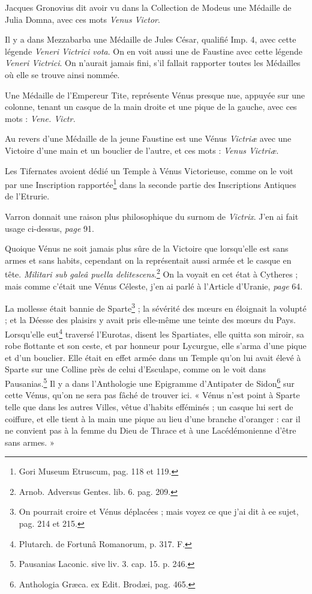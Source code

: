 \documentclass[a4paper, 18pt, oneside]{article}
\begin{document}
Jacques Gronovius dit avoir vu dans la Collection de Modeus une Médaille de Julia Domna, avec ces mots \emph{Venus Victor}.

Il y a dans Mezzabarba une Médaille de Jules César, qualifié Imp. 4, avec cette légende \emph{Veneri Victrici vota}. On en voit aussi une de Faustine avec cette légende \emph{Veneri Victrici}. On n'aurait jamais fini, s'il fallait rapporter toutes les Médailles où elle se trouve ainsi nommée.

Une Médaille de l'Empereur Tite, représente Vénus presque nue, appuyée sur une colonne, tenant un casque de la main droite et une pique de la gauche, avec ces mots : \emph{Vene. Victr.}

Au revers d'une Médaille de la jeune Faustine est une Vénus \emph{Victriæ} avec une Victoire d'une main et un bouclier de l'autre, et ces mots : \emph{Venus Victriæ}.

Les Tifernates avoient dédié un Temple à Vénus Victorieuse, comme on le voit par une Inscription rapportée\footnote{Gori Museum Etruscum, pag. 118 et 119.} dans la seconde partie des Inscriptions Antiques de l'Etrurie.

Varron donnait une raison plus philosophique du surnom de \emph{Victrix}. J'en ai fait usage ci-dessus, \emph{page} 91.

Quoique Vénus ne soit jamais plus sûre de la Victoire que lorsqu'elle est sans armes et sans habits, cependant on la représentait aussi armée et le casque en tête. \emph{Militari sub galeâ puella delitescens}.\footnote{Arnob. Adversus Gentes. lib. 6. pag. 209.} On la voyait en cet état à Cytheres ; mais comme c'était une Vénus Céleste, j'en ai parlé à l'Article d'Uranie, \emph{page} 64.

La mollesse était bannie de Sparte\footnote{On pourrait croire et Vénus déplacées ; mais voyez ce que j'ai dit à ee sujet, pag. 214 et 215.} ; la sévérité des mœurs en éloignait la volupté ; et la Déesse des plaisirs y avait pris elle-même une teinte des mœurs du Pays. Lorsqu'elle eut\footnote{Plutarch. de Fortunâ Romanorum, p. 317. F.} traversé l'Eurotas, disent les Spartiates, elle quitta son miroir, sa robe flottante et son ceste, et par honneur pour Lycurgue, elle s'arma d'une pique et d'un bouclier. Elle était en effet armée dans un Temple qu'on lui avait élevé à Sparte sur une Colline près de celui d'Esculape, comme on le voit dans Pausanias.\footnote{Pausanias Laconic. sive liv. 3. cap. 15. p. 246.} Il y a dans l'Anthologie une Epigramme d'Antipater de Sidon\footnote{Anthologia Græca. ex Edit. Brodæi, pag. 465.} sur cette Vénus, qu'on ne sera pas fâché de trouver ici. « Vénus n'est point à Sparte telle que dans les autres Villes, vêtue d'habits efféminés ; un casque lui sert de coiffure, et elle tient à la main une pique au lieu d'une branche d'oranger : car il ne convient pas à la femme du Dieu de Thrace et à une Lacédémonienne d'être sans armes. »
\end{document}

